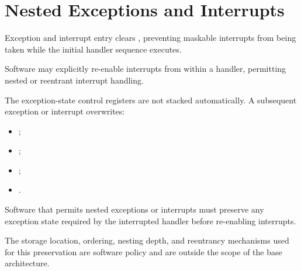 \section{Nested Exceptions and Interrupts}

Exception and interrupt entry clears , preventing maskable interrupts from being
taken while the initial handler sequence executes.

Software may explicitly re-enable interrupts from within a handler, permitting nested or
reentrant interrupt handling.

The exception-state control registers are not stacked automatically. A subsequent exception or
interrupt overwrites:

\begin{itemize}
\item {};
\item {};
\item {};
\item {}.
\end{itemize}

Software that permits nested exceptions or interrupts must preserve any exception state required
by the interrupted handler before re-enabling interrupts.

The storage location, ordering, nesting depth, and reentrancy mechanisms used for this
preservation are software policy and are outside the scope of the base architecture.
